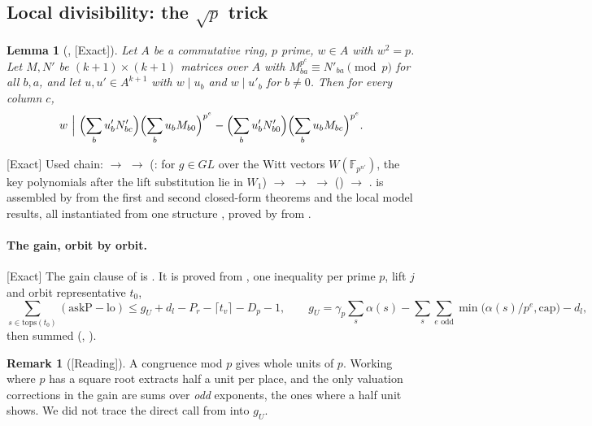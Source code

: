 \documentclass[11pt]{article}
\newcommand{\Exact}{\textcolor{exactc}{\textsf{\small[Exact]}}}
\newcommand{\Reading}{\textcolor{readc}{\textsf{\small[Reading]}}}
\theoremstyle{plain}
\newtheorem{lemma}[theorem]{Lemma}
\theoremstyle{definition}
\newtheorem{remark}[theorem]{Remark}
\begin{document}
\subsection{Local divisibility: the $\sqrt p$ trick}

\begin{lemma}[, \Exact]
Let $A$ be a commutative ring, $p$ prime, $w\in A$ with $w^2=p$. Let $M,N'$ be
$(k+1)\times(k+1)$ matrices over $A$ with $M_{ba}^{p^e}\equiv N'_{ba}\pmod p$ for all $b,a$, and let
$u,u'\in A^{k+1}$ with $w\mid u_b$ and $w\mid u'_b$ for $b\neq0$. Then for every column $c$,
\[
w\ \Big|\ \Bigl(\sum_b u'_bN'_{bc}\Bigr)\Bigl(\sum_b u_bM_{b0}\Bigr)^{p^e}-\Bigl(\sum_b u'_bN'_{b0}\Bigr)\Bigl(\sum_bu_bM_{bc}\Bigr)^{p^e}.
\]
\end{lemma}

\Exact{} Used chain:  $\to$  $\to$ 
(: for $g\in GL$ over the Witt vectors $W(\mathbb F_{p^{n'}})$,
the key polynomials after the lift substitution lie in $W_1$) $\to$ 
$\to$  $\to$  () $\to$
.  is assembled by  from the first
and second closed-form theorems and the local model results, all instantiated from one structure
, proved by  from .

\paragraph{The gain, orbit by orbit.} \Exact{} The gain clause of  is
. It is proved from , one inequality per prime $p$,
lift $j$ and orbit representative $t_0$,
\[
\sum_{s\in\mathrm{tops}(t_0)}(\mathrm{askP}-\mathrm{lo})\le g_U+d_l-P_r-\lceil t_v\rceil-D_p-1,
\qquad
g_U=\gamma_p\sum_s\alpha(s)-\sum_s\sum_{e\text{ odd}}\min\bigl(\alpha(s)/p^e,\mathrm{cap}\bigr)-d_l,
\]
then summed (, ).

\begin{remark}[\Reading]
A congruence mod $p$ gives whole units of $p$. Working where $p$ has a square root extracts half a
unit per place, and the only valuation corrections in the gain are sums over \emph{odd} exponents,
the ones where a half unit shows. We did not trace the direct call from  into $g_U$.
\end{remark}
\end{document}
